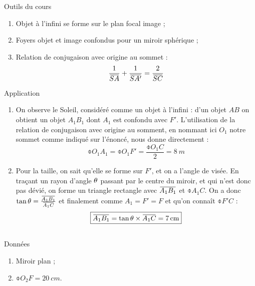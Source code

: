 \documentclass[10pt,a5paper,notitlepage]{book}
\begin{document}
\begin{NCdemo}{Outils du cours}
    \begin{enumerate}
        \item Objet à l'infini se forme sur le plan focal image ;
        \item Foyers objet et image confondus pour un miroir sphérique ;
        \item Relation de conjugaison avec origine au sommet :
            \[ \frac{1}{\SA} + \frac{1}{\SAp} = \frac{2}{\SC} \]
    \end{enumerate}
\end{NCdemo}

\begin{NCexem}{Application}
    \begin{enumerate}
        \item On observe le Soleil, considéré comme un objet à l'infini : d'un
            objet $AB$ on obtient un objet $A_1B_1$ dont $A_1$ est confondu avec
            $F'$.  L'utilisation de la relation de conjugaison avec origine au
            somment, en nommant ici $O_1$ notre sommet comme indiqué sur
            l'énoncé, nous donne directement : \[ \boxed{\obar{O_1A_1} =
            \obar{O_1F'} = \frac{\obar{O_1C}}{2} = \SI{8}{m}} \]

        \item Pour la taille, on sait qu'elle se forme sur $F'$, et on a l'angle
            de visée. En traçant un rayon d'angle $\theta$ passant par le centre du
            miroir, et qui n'est donc pas dévié, on forme un triangle rectangle
            avec $\ABa$ et $\obar{A_1C}$. On a donc $\tan\t =
            \frac{\ABa}{\obar{A_1C}}$ et finalement comme $A_1 = F' = F$ et
            qu'on connaît $\obar{F'C}$ :
            \[ \boxed{\ABa = \tan\t\times\obar{A_1C} = \SI{7}{cm}} \]
    \end{enumerate}
\end{NCexem}

\subsection{}

\begin{NCdefi}{Données}
    \begin{enumerate}
        \item Miroir plan ;
        \item $\obar{O_2F} = \SI{20}{cm}$.
    \end{enumerate}
\end{NCdefi}
\end{document}
